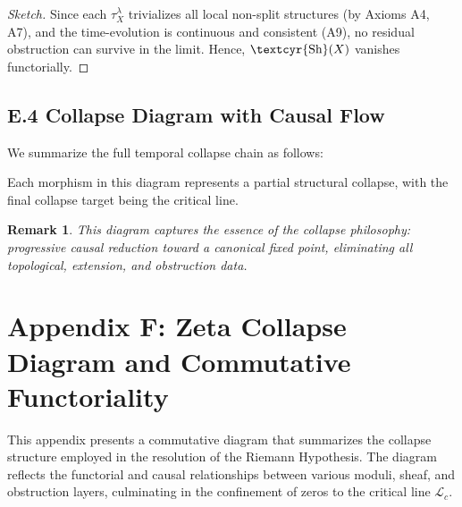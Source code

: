 \documentclass[11pt]{article}
\newtheorem{remark}[theorem]{Remark}
\newcommand{\Sha}{\text{\textcyr{Sh}}}
\begin{document}
\begin{proof}[Sketch]
Since each $\tau^\lambda_X$ trivializes all local non-split structures (by Axioms A4, A7),  
and the time-evolution is continuous and consistent (A9), no residual obstruction can survive in the limit.  
Hence, $\Sha(X)$ vanishes functorially.
\end{proof}

\subsection*{E.4 Collapse Diagram with Causal Flow}

We summarize the full temporal collapse chain as follows:
\begin{center}
\end{center}


Each morphism in this diagram represents a partial structural collapse, with the final collapse target being the critical line.

\begin{remark}
This diagram captures the essence of the collapse philosophy:  
progressive causal reduction toward a canonical fixed point, eliminating all topological, extension, and obstruction data.
\end{remark}



\section*{Appendix F: Zeta Collapse Diagram and Commutative Functoriality}

This appendix presents a commutative diagram that summarizes the collapse structure employed in the resolution of the Riemann Hypothesis.  
The diagram reflects the functorial and causal relationships between various moduli, sheaf, and obstruction layers,  
culminating in the confinement of zeros to the critical line $\mathcal{L}_c$.
\end{document}
